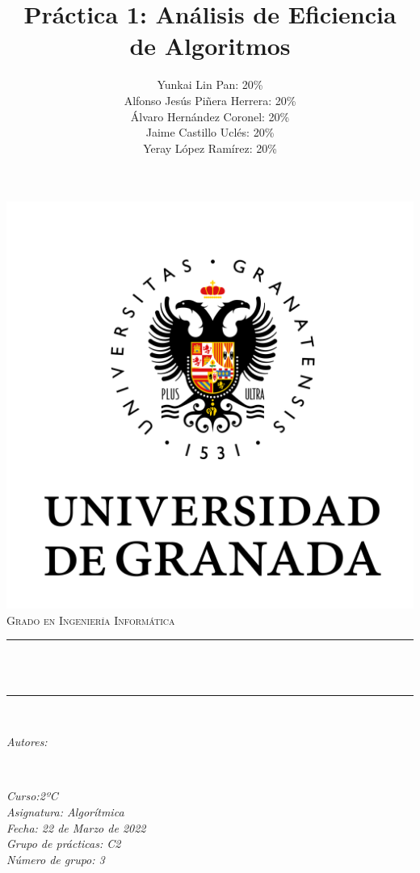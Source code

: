 \documentclass[12pt, spanish]{article}
\title{Práctica 1: Análisis de Eficiencia de Algoritmos \hspace{0.05cm} }
\date{}
\author{
Yunkai Lin Pan: 20\% \\
Alfonso Jesús Piñera Herrera: 20\% \\
Álvaro Hernández Coronel: 20\%  \\
Jaime Castillo Uclés: 20\% \\
Yeray López Ramírez: 20\% \\
}
\makeatletter
\let\thetitle\@title
\let\theauthor\@author
\makeatother
\begin{document}
\begin{titlepage}
  \centering
  \vspace*{0.5 cm}
  \includegraphics[scale = 0.50]{ugr.png}\\[1.0 cm]
  \textsc{\huge Grado en Ingeniería Informática}\\[0.5 cm]
  \rule{\linewidth}{0.2 mm} \\[0.4 cm]
  { \huge \bfseries \thetitle}\\
  \rule{\linewidth}{0.2 mm} \\[1.5 cm]
  
  \begin{minipage}{0.4\textwidth}
    \begin{flushleft} \large
        \emph{Autores:}\\

        \small \theauthor
        \end{flushleft}
        \end{minipage}~
        \begin{minipage}{0.4\textwidth}
        \begin{flushright} \large
        \emph{Curso:2ºC \\
        Asignatura: Algorítmica \\
        Fecha: 22 de Marzo de 2022 \\
        Grupo de prácticas: C2 \\
        Número de grupo: 3}
    \end{flushright}
\end{minipage}\\[1 cm]


\vfill
  
\end{titlepage}
\end{document}
